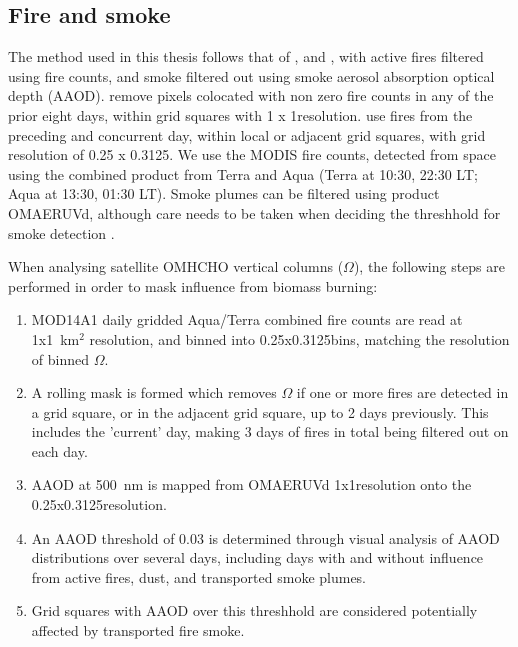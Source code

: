   
  \subsection{Fire and smoke}
    \label{Model:Filter:fire}
    
    The method used in this thesis follows that of \textcite{Marais2012}, and \textcite{Barkley2013}, with active fires filtered using fire counts, and smoke filtered out using smoke aerosol absorption optical depth (AAOD).
    \textcite{Marais2012} remove pixels colocated with non zero fire counts in any of the prior eight days, within grid squares with 1 x 1\degr resolution.
    \textcite{Barkley2013} use fires from the preceding and concurrent day, within local or adjacent grid squares, with grid resolution of 0.25 x 0.3125\degr.
    We use the MODIS fire counts, detected from space using the combined product from Terra and Aqua (Terra at 10:30, 22:30 LT; Aqua at 13:30, 01:30 LT).
    Smoke plumes can be filtered using product OMAERUVd, although care needs to be taken when deciding the threshhold for smoke detection \parencite{Marais2012}.
    
    When analysing satellite OMHCHO vertical columns ($\Omega$), the following steps are performed in order to mask influence from biomass burning:
    \begin{enumerate}
      \item MOD14A1 daily gridded Aqua/Terra combined fire counts are read at 1x1~km$^2$ resolution, and binned into 0.25x0.3125\degr bins, matching the resolution of binned $\Omega$.
      \item A rolling mask is formed which removes $\Omega$ if one or more fires are detected in a grid square, or in the adjacent grid square, up to 2 days previously.
      This includes the 'current' day, making 3 days of fires in total being filtered out on each day.
      \item AAOD at 500~nm is mapped from OMAERUVd 1x1\degr resolution onto the 0.25x0.3125\degr resolution.
      \item An AAOD threshold of 0.03 is determined through visual analysis of AAOD distributions over several days, including days with and without influence from active fires, dust, and transported smoke plumes.
      \item Grid squares with AAOD over this threshhold are considered potentially affected by transported fire smoke.
    \end{enumerate}
  
